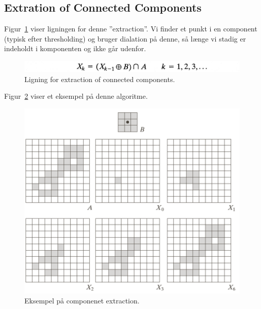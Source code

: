 \subsection{Extration of Connected Components}
 
Figur~\ref{fig:connected-component} viser ligningen for denne ''extraction''. Vi finder et punkt i en component (typisk efter thresholding) og bruger dialation på denne, så længe vi stadig er indeholdt i komponenten og ikke går udenfor.

\begin{figure}[H]
	\centering
	\includegraphics[width=0.7\linewidth]{figs/spm10/connected-component}
	\caption{Ligning for extraction of connected components.}
	\label{fig:connected-component}
\end{figure}

Figur~\ref{fig:connected-component-example} viser et eksempel på denne algoritme.

\begin{figure}[H]
	\centering
	\includegraphics[width=0.9\linewidth]{figs/spm10/connected-component-example}
	\caption{Eksempel på componenet extraction.}
	\label{fig:connected-component-example}
\end{figure}
